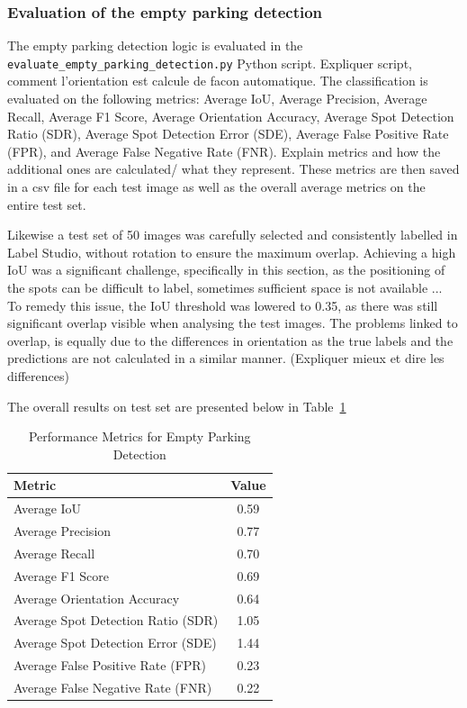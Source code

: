 \newpage{}

\subsubsection{Evaluation of the empty parking detection}
The empty parking detection logic is evaluated in the \texttt{evaluate\_empty\_parking\_detection.py} Python script.
Expliquer script, comment l'orientation est calcule de facon automatique.
The classification is evaluated on the following metrics: Average IoU, Average Precision, Average Recall, Average F1 Score, Average Orientation Accuracy, Average Spot Detection Ratio (SDR), Average Spot Detection Error (SDE), Average False Positive Rate (FPR), and Average False Negative Rate (FNR).
Explain metrics and how the additional ones are calculated/ what they represent.
These metrics are then saved in a csv file for each test image as well as the overall average metrics on the entire test set.

Likewise a test set of 50 images was carefully selected and consistently labelled in Label Studio, without rotation to ensure the maximum overlap.
Achieving a high IoU was a significant challenge, specifically in this section, as the positioning of the spots can be difficult to label, sometimes sufficient space is not available ...
To remedy this issue, the IoU threshold was lowered to 0.35, as there was still significant overlap visible when analysing the test images.
The problems linked to overlap, is equally due to the differences in orientation as the true labels and the predictions are not calculated in a similar manner. (Expliquer mieux et dire les differences)

The overall results on test set are presented below in Table~\ref{tab:metrics2}

\begin{table}[htbp]
    \centering
    \begin{tabular}{|l|c|}
    \hline
    \textbf{Metric}                            & \textbf{Value} \\ \hline
    Average IoU                                & 0.59           \\ \hline
    Average Precision                          & 0.77           \\ \hline
    Average Recall                             & 0.70           \\ \hline
    Average F1 Score                           & 0.69           \\ \hline
    Average Orientation Accuracy               & 0.64           \\ \hline
    Average Spot Detection Ratio (SDR)         & 1.05           \\ \hline
    Average Spot Detection Error (SDE)         & 1.44           \\ \hline
    Average False Positive Rate (FPR)          & 0.23           \\ \hline
    Average False Negative Rate (FNR)          & 0.22           \\ \hline
    \end{tabular}
    \caption{Performance Metrics for Empty Parking Detection}
    \label{tab:metrics2}
\end{table}

